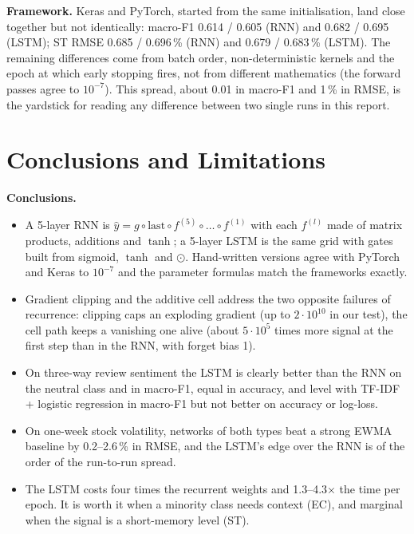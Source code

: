 \documentclass[11pt, a4paper]{article}
\begin{document}
\textbf{Framework.} Keras and PyTorch, started from the same initialisation, land close together but not identically: macro-F1 0.614 / 0.605 (RNN) and 0.682 / 0.695 (LSTM); ST RMSE 0.685 / 0.696\,\% (RNN) and 0.679 / 0.683\,\% (LSTM). The remaining differences come from batch order, non-deterministic kernels and the epoch at which early stopping fires, not from different mathematics (the forward passes agree to $10^{-7}$).
This spread, about 0.01 in macro-F1 and 1\,\% in RMSE, is the yardstick for reading any difference between two single runs in this report.

\section{Conclusions and Limitations}
\label{sec:limits}

\textbf{Conclusions.}
\begin{itemize}
\item A 5-layer RNN is $\hat y=g\circ\mathrm{last}\circ f^{(5)}\circ\dots\circ f^{(1)}$ with each $f^{(l)}$ made of matrix products, additions and $\tanh$; a 5-layer LSTM is the same grid with gates built from sigmoid, $\tanh$ and $\odot$. Hand-written versions agree with PyTorch and Keras to $10^{-7}$ and the parameter formulas match the frameworks exactly.
\item Gradient clipping and the additive cell address the two opposite failures of recurrence: clipping caps an exploding gradient (up to $2\cdot10^{10}$ in our test), the cell path keeps a vanishing one alive (about $5\cdot10^{5}$ times more signal at the first step than in the RNN, with forget bias 1).
\item On three-way review sentiment the LSTM is clearly better than the RNN on the neutral class and in macro-F1, equal in accuracy, and level with TF-IDF + logistic regression in macro-F1 but not better on accuracy or log-loss.
\item On one-week stock volatility, networks of both types beat a strong EWMA baseline by 0.2--2.6\,\% in RMSE, and the LSTM's edge over the RNN is of the order of the run-to-run spread.
\item The LSTM costs four times the recurrent weights and 1.3--4.3$\times$ the time per epoch. It is worth it when a minority class needs context (EC), and marginal when the signal is a short-memory level (ST).
\end{itemize}
\end{document}
